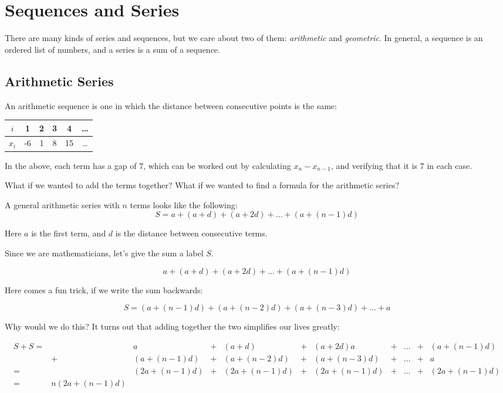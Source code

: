 \section{Sequences and Series}\label{sec:series}

There are many kinds of series and sequences, but we care about two of them: \emph{arithmetic} and \emph{geometric}.
In general, a sequence is an ordered list of numbers, and a series is a sum of a sequence.
\subsection{Arithmetic Series}

An arithmetic sequence is one in which the distance between consecutive points is the same:

    \begin{center}
    \begin{tabular}{c|ccccc}
    $i$      & 1 & 2 & 3 & 4 & \dots\\
    \hline
    $x_i$ & -6 & 1 & 8 & 15 & \dots
    \end{tabular}
    \end{center}
In the above, each term has a gap of $7$, which can be worked out by calculating $x_n - x_{n-1}$, and verifying that it is $7$ in each case.

What if we wanted to add the terms together? What if we wanted to find a formula for the arithmetic series? 

A general arithmetic series with $n$ terms looks like the following:
\[ S = a + (a+d) + (a + 2d) + \dots + (a + (n-1)d)\]

Here $a$ is the first term, and $d$ is the distance between consecutive terms.

Since we are mathematicians, let's give the sum a label $S$.

\[ a + (a+d) + (a + 2d) + \dots + (a + (n-1)d)\]

Here comes a fun trick, if we write the sum backwards:


\[ S = (a + (n-1)d) + (a + (n-2)d) +(a + (n-3)d) + \dots + a\]

Why would we do this? It turns out that adding together the two simplifies our lives greatly:

\begin{align*}
    S + S =& &a &+ &(a+d) &+ &(a+2d)a &+ &\dots &+ &(a + (n-1)d)\\
        &+ &(a + (n-1)d)  &+ &(a + (n-2)d)  &+&(a + (n-3)d) &+ &\dots& + &a\\
        =& &(2a + (n-1)d)  &+ &(2a + (n-1)d)   &+&(2a + (n-1)d)  &+ &\dots& + &(2a + (n-1)d) \\
        =& n(2a + (n-1)d) 
\end{align*}

